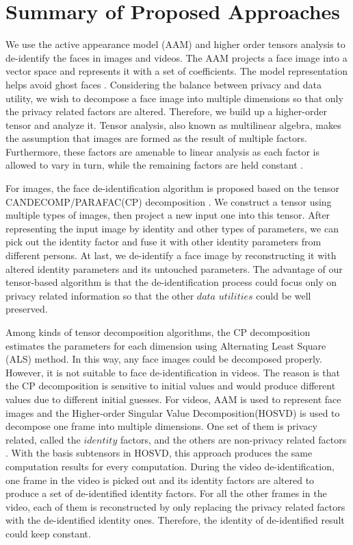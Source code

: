 \section{Summary of Proposed Approaches}
\label{sec:approach}
We use the active appearance model (AAM) \cite{AAM01,Matthews_04} and higher order 
tensors analysis to de-identify the faces in images and videos. The AAM projects
a face image into a vector space and represents it with a set of coefficients.
The model representation helps avoid ghost faces \cite{Gross08}. Considering
the balance between privacy and data utility, we wish to decompose a face image
into multiple dimensions so that only the privacy related factors are altered. 
Therefore, we build up a higher-order tensor and analyze it. 
Tensor analysis, also known as multilinear algebra, makes the assumption that 
images are formed as the result of multiple factors. Furthermore, these factors 
are amenable to linear analysis as each factor is allowed to vary in turn, while 
the remaining factors are held constant \cite{Vasi02,VasilescuT03}.

For images, the face de-identification algorithm is proposed based on the tensor 
CANDECOMP/PARAFAC(CP) decomposition \cite{Lathauwer_rank,Kolda09}. We construct 
a tensor using multiple types of images, then 
project a new input one into this tensor. After representing the input image by 
identity and other types of parameters, we can pick out the identity factor and 
fuse it with other identity parameters from different persons. At last, we de-identify 
a face image by reconstructing it with altered identity parameters and its 
untouched parameters. The advantage of our tensor-based algorithm is that the 
de-identification process could focus only on privacy related information so that 
the other $data$ $utilities$ could be well preserved. 

Among kinds of tensor decomposition algorithms, the CP decomposition estimates
the parameters for each dimension using Alternating Least Square (ALS) method.
In this way, any face images could be decomposed properly. However, it is not
suitable to face de-identification in videos. The reason is that the CP
decomposition is sensitive to initial values and would produce different
values due to different initial guesses. For videos, AAM is used to represent
face images and the Higher-order Singular 
Value Decomposition(HOSVD) \cite{Lathauwer00} is used to decompose one frame 
into multiple dimensions. One set of them is privacy related, called the 
$identity$ factors, and the others are non-privacy related factors 
\cite{Feng12,TPAMI09}. With the basis subtensors in HOSVD, this approach 
produces the same computation results for every computation. 
During the video de-identification, one frame in the 
video is picked out and its identity factors are altered to produce a set of 
de-identified identity factors. For all the other frames in the video, each 
of them is reconstructed by only replacing the privacy related factors with 
the de-identified identity ones. Therefore, the identity of de-identified 
result could keep constant.

